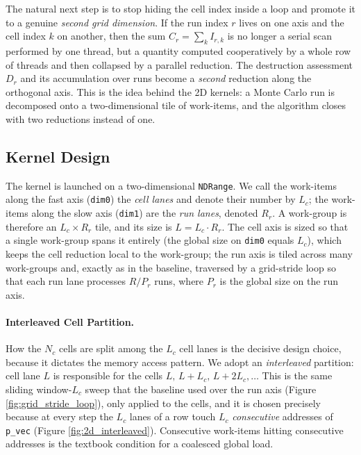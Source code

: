 The natural next step is to stop hiding the cell index inside a loop and promote it to a genuine \emph{second grid dimension}. If the run index $r$ lives on one axis and the cell index $k$ on another, then the sum $C_r = \sum_k I_{r,k}$ is no longer a serial scan performed by one thread, but a quantity computed cooperatively by a whole row of threads and then collapsed by a parallel reduction. The destruction assessment $D_r$ and its accumulation over runs become a \emph{second} reduction along the orthogonal axis. This is the idea behind the 2D kernels: a Monte Carlo run is decomposed onto a two-dimensional tile of work-items, and the algorithm closes with two reductions instead of one.

\subsection{Kernel Design}\label{subsec:2d_design}
The kernel is launched on a two-dimensional \texttt{NDRange}. We call the work-items along the fast axis (\texttt{dim0}) the \emph{cell lanes} and denote their number by $L_c$; the work-items along the slow axis (\texttt{dim1}) are the \emph{run lanes}, denoted $R_r$. A work-group is therefore an $L_c \times R_r$ tile, and its size is $L = L_c \cdot R_r$. The cell axis is sized so that a single work-group spans it entirely (the global size on \texttt{dim0} equals $L_c$), which keeps the cell reduction local to the work-group; the run axis is tiled across many work-groups and, exactly as in the baseline, traversed by a grid-stride loop so that each run lane processes $R / P_r$ runs, where $P_r$ is the global size on the run axis.

\paragraph{Interleaved Cell Partition.}
How the $N_c$ cells are split among the $L_c$ cell lanes is the decisive design choice, because it dictates the memory access pattern. We adopt an \emph{interleaved} partition: cell lane $L$ is responsible for the cells $L,\, L+L_c,\, L+2L_c, \dots$ This is the same sliding window-$L_c$ sweep that the baseline used over the run axis (Figure \ref{fig:grid_stride_loop}), only applied to the cells, and it is chosen precisely because at every step the $L_c$ lanes of a row touch $L_c$ \emph{consecutive} addresses of \texttt{p\_vec} (Figure \ref{fig:2d_interleaved}). Consecutive work-items hitting consecutive addresses is the textbook condition for a coalesced global load.


